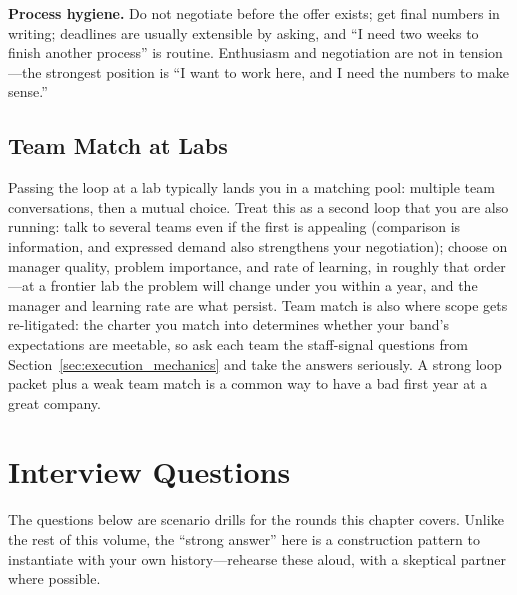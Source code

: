 \textbf{Process hygiene.} Do not negotiate before the offer exists; get final numbers in writing; deadlines are usually extensible by asking, and ``I need two weeks to finish another process'' is routine. Enthusiasm and negotiation are not in tension---the strongest position is ``I want to work here, and I need the numbers to make sense.''

\subsection{Team Match at Labs}

Passing the loop at a lab typically lands you in a matching pool: multiple team conversations, then a mutual choice. Treat this as a second loop that you are also running: talk to several teams even if the first is appealing (comparison is information, and expressed demand also strengthens your negotiation); choose on manager quality, problem importance, and rate of learning, in roughly that order---at a frontier lab the problem will change under you within a year, and the manager and learning rate are what persist. Team match is also where scope gets re-litigated: the charter you match into determines whether your band's expectations are meetable, so ask each team the staff-signal questions from Section~\ref{sec:execution_mechanics} and take the answers seriously. A strong loop packet plus a weak team match is a common way to have a bad first year at a great company.

\section{Interview Questions}
\label{sec:staff_loop_interview}

The questions below are scenario drills for the rounds this chapter covers. Unlike the rest of this volume, the ``strong answer'' here is a construction pattern to instantiate with your own history---rehearse these aloud, with a skeptical partner where possible.


